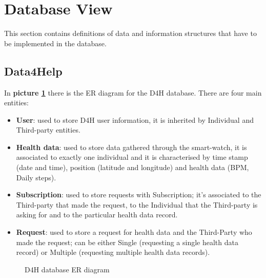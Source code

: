 \section{Database View}

This section contains definitions of data and information structures that have to be implemented in the database.

\subsection{Data4Help}

In \textbf{picture \ref{fig:D4H-er}} there is the ER diagram for the D4H database.
There are four main entities:
\begin{itemize}
    \item \textbf{User}: used to store D4H user information, it is inherited by Individual and Third-party entities.
    \item \textbf{Health data}: used to store data gathered through the smart-watch, it is associated to exactly one individual and it is characterised by time stamp (date and time), position (latitude and longitude) and health data (BPM, Daily steps). 
    \item \textbf{Subscription}: used to store requests with Subscription; it's associated to the Third-party that made the request, to the Individual that the Third-party is asking for and to the particular health data record.
    \item \textbf{Request}: used to store a request for health data and the Third-Party who made the request; can be either Single (requesting a single health data record) or Multiple (requesting multiple health data records).
\end{itemize}

\begin{figure}[H]
    \centering
    \caption{D4H database ER diagram}
    \label{fig:D4H-er}
\end{figure}


